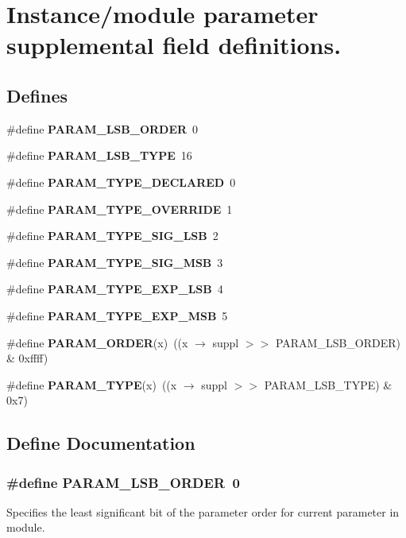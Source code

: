 \section{Instance/module parameter supplemental field definitions.}
\label{group__param__suppl}
\subsection*{Defines}
\begin{CompactItemize}
\item 
\#define {\bf PARAM\_\-LSB\_\-ORDER}\ 0
\item 
\#define {\bf PARAM\_\-LSB\_\-TYPE}\ 16
\item 
\#define {\bf PARAM\_\-TYPE\_\-DECLARED}\ 0
\item 
\#define {\bf PARAM\_\-TYPE\_\-OVERRIDE}\ 1
\item 
\#define {\bf PARAM\_\-TYPE\_\-SIG\_\-LSB}\ 2
\item 
\#define {\bf PARAM\_\-TYPE\_\-SIG\_\-MSB}\ 3
\item 
\#define {\bf PARAM\_\-TYPE\_\-EXP\_\-LSB}\ 4
\item 
\#define {\bf PARAM\_\-TYPE\_\-EXP\_\-MSB}\ 5
\item 
\#define {\bf PARAM\_\-ORDER}(x)\ ((x $\rightarrow$ suppl $>$$>$ PARAM\_\-LSB\_\-ORDER) \& 0xffff)
\item 
\#define {\bf PARAM\_\-TYPE}(x)\ ((x $\rightarrow$ suppl $>$$>$ PARAM\_\-LSB\_\-TYPE) \& 0x7)
\end{CompactItemize}


\subsection{Define Documentation}
\subsubsection{\setlength{\rightskip}{0pt plus 5cm}\#define PARAM\_\-LSB\_\-ORDER\ 0}\label{group__param__suppl_a0}


Specifies the least significant bit of the parameter order for current parameter in module. 
